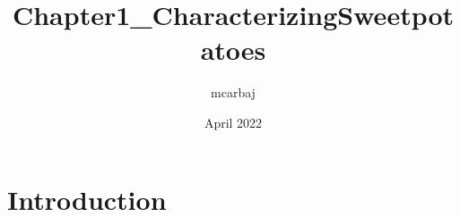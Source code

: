 \documentclass{article}
\title{Chapter1_CharacterizingSweetpotatoes}
\author{mcarbaj }
\date{April 2022}
\begin{document}
\maketitle

\section{Introduction}
\end{document}
